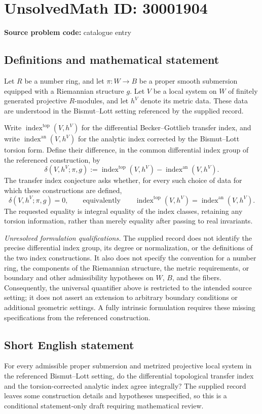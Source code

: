 \documentclass[11pt]{article}
\begin{document}
\section*{UnsolvedMath ID: 30001904}
\textbf{Source problem code:} catalogue entry
\subsection{Definitions and mathematical statement}
Let \(R\) be a number ring, and let \(\pi\colon W\to B\) be a proper smooth submersion equipped with a Riemannian structure \(g\). Let \(V\) be a local system on \(W\) of finitely generated projective \(R\)-modules, and let \(h^V\) denote its metric data. These data are understood in the Bismut--Lott setting referenced by the supplied record.

Write \(\operatorname{index}^{\mathrm{top}}(V,h^V)\) for the differential Becker--Gottlieb transfer index, and write \(\operatorname{index}^{\mathrm{an}}(V,h^V)\) for the analytic index corrected by the Bismut--Lott torsion form. Define their difference, in the common differential index group of the referenced construction, by
\[
\delta(V,h^V;\pi,g)
:=\operatorname{index}^{\mathrm{top}}(V,h^V)
-\operatorname{index}^{\mathrm{an}}(V,h^V).
\]
The transfer index conjecture asks whether, for every such choice of data for which these constructions are defined,
\[
\delta(V,h^V;\pi,g)=0,
\qquad\text{equivalently}\qquad
\operatorname{index}^{\mathrm{top}}(V,h^V)
=\operatorname{index}^{\mathrm{an}}(V,h^V).
\]
The requested equality is integral equality of the index classes, retaining any torsion information, rather than merely equality after passing to real invariants.

\emph{Unresolved formulation qualifications.} The supplied record does not identify the precise differential index group, its degree or normalization, or the definitions of the two index constructions. It also does not specify the convention for a number ring, the components of the Riemannian structure, the metric requirements, or boundary and other admissibility hypotheses on \(W\), \(B\), and the fibers. Consequently, the universal quantifier above is restricted to the intended source setting; it does not assert an extension to arbitrary boundary conditions or additional geometric settings. A fully intrinsic formulation requires these missing specifications from the referenced construction.
\subsection{Short English statement}
For every admissible proper submersion and metrized projective local system in the referenced Bismut--Lott setting, do the differential topological transfer index and the torsion-corrected analytic index agree integrally? The supplied record leaves some construction details and hypotheses unspecified, so this is a conditional statement-only draft requiring mathematical review.
\end{document}
